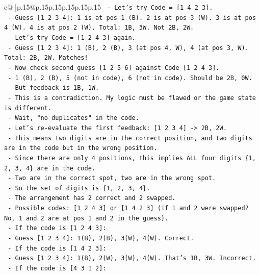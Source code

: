 \documentclass{article}
\begin{document}
{\begin{supertabular}{c@{$\;$}|p{.15\linewidth}@{}p{.15\linewidth}p{.15\linewidth}p{.15\linewidth}p{.15\linewidth}p{.15\linewidth}}
{{{\texttt{    {-} Let's try Code = {[}1 4 2 3{]}.} \\
\texttt{      {-} Guess {[}1 2 3 4{]}: 1 is at pos 1 (B). 2 is at pos 3 (W). 3 is at pos 4 (W). 4 is at pos 2 (W). Total: 1B, 3W. Not 2B, 2W.} \\
\texttt{    {-} Let's try Code = {[}1 2 4 3{]} again.} \\
\texttt{      {-} Guess {[}1 2 3 4{]}: 1 (B), 2 (B), 3 (at pos 4, W), 4 (at pos 3, W). Total: 2B, 2W. Matches!} \\
\texttt{      {-} Now check second guess {[}1 2 5 6{]} against Code {[}1 2 4 3{]}.} \\
\texttt{        {-} 1 (B), 2 (B), 5 (not in code), 6 (not in code). Should be 2B, 0W.} \\
\texttt{        {-} But feedback is 1B, 1W.} \\
\texttt{    {-} This is a contradiction. My logic must be flawed or the game state is different.} \\
\texttt{    {-} Wait, "no duplicates" in the code.} \\
\texttt{    {-} Let's re{-}evaluate the first feedback: {[}1 2 3 4{]} {-}> 2B, 2W.} \\
\texttt{      {-} This means two digits are in the correct position, and two digits are in the code but in the wrong position.} \\
\texttt{      {-} Since there are only 4 positions, this implies ALL four digits \{1, 2, 3, 4\} are in the code.} \\
\texttt{      {-} Two are in the correct spot, two are in the wrong spot.} \\
\texttt{      {-} So the set of digits is \{1, 2, 3, 4\}.} \\
\texttt{      {-} The arrangement has 2 correct and 2 swapped.} \\
\texttt{      {-} Possible codes: {[}1 2 4 3{]} or {[}1 4 2 3{]} (if 1 and 2 were swapped? No, 1 and 2 are at pos 1 and 2 in the guess).} \\
\texttt{      {-} If the code is {[}1 2 4 3{]}:} \\
\texttt{        {-} Guess {[}1 2 3 4{]}: 1(B), 2(B), 3(W), 4(W). Correct.} \\
\texttt{      {-} If the code is {[}1 4 2 3{]}:} \\
\texttt{        {-} Guess {[}1 2 3 4{]}: 1(B), 2(W), 3(W), 4(W). That's 1B, 3W. Incorrect.} \\
\texttt{      {-} If the code is {[}4 3 1 2{]}:} \\
}}}
\end{supertabular}}
\end{document}
